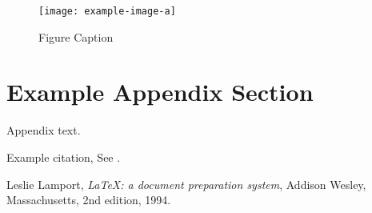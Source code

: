 \documentclass[preprint,12pt,authoryear]{elsarticle}
\begin{document}
\begin{figure}[t]%
\centering%
\texttt{[image: example-image-a]}
\caption{Figure Caption}\label{fig1}
\end{figure}


\appendix
\section{Example Appendix Section}
\label{app1}

Appendix text.

Example citation, See \citet{lamport94}.




\begin{thebibliography}{00}


  Leslie Lamport,
  \textit{\LaTeX: a document preparation system},
  Addison Wesley, Massachusetts,
  2nd edition,
  1994.

\end{thebibliography}
\end{document}
